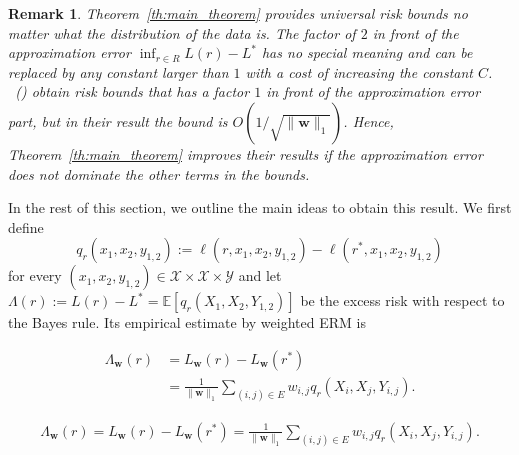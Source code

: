 \documentclass[letterpaper]{article} %
\def\DoubleColumn{}
\def\DoubleColumnEnd{}
\def\SingleColumn{}
\def\SingleColumnEnd{}
\newtheorem{remark}{Remark}
\newtheorem*{remark*}{Remark}
\newcommand{\E}{\mathbb{E}}
\newcommand{\weight}{\mathbf{w}}
\newcommand{\yspace}{\mathcal{Y}}
\newcommand{\bayeserror}{L^*}
\newcommand{\empiricalrisk}[1]{L_{#1}}
\newcommand{\risk}{L}
\newcommand{\lossf}{\ell}
\newcommand{\pair}[1]{(#1)}
\newcommand{\normo}[1]{\|#1\|_1}
\newcommand{\citet}[1]{\citeauthor{#1}\ (\citeyear{#1})}
\begin{document}
\begin{remark*}
Theorem~\ref{th:main_theorem} provides universal risk bounds no matter what the distribution of the data is. The factor of $2$ in front of the approximation error $\inf_{r\in R}\risk(r)-\bayeserror$ has no special meaning and can be replaced by any constant larger than $1$ with a cost of increasing the constant $C$. 
\citet{wang2017learning} obtain risk bounds that has a factor $1$ in front of the approximation error part, but in their result the bound is $O(1/\sqrt{\normo{\weight{}}})$. 
Hence, Theorem~\ref{th:main_theorem} improves their results if the approximation error does not dominate the other terms in the bounds.
\end{remark*}


In the rest of this section, we outline the main ideas to obtain this result.
We first define
\[q_r(x_1,x_2,y_{1,2}):=\lossf(r, x_1,x_2,y_{1,2})-\lossf(r^*,x_1,x_2,y_{1,2})\]
for every $(x_1,x_2,y_{1,2})\in \mathcal X\times\mathcal X\times\yspace{}$ and let $\Lambda(r) := \risk(r)-\bayeserror=\E[q_r(X_1,X_2,Y_{1,2})]$
be the excess risk with respect to the Bayes rule.
Its empirical estimate by weighted ERM is 
\DoubleColumn
\begin{align*}
    \Lambda_\weight{}(r) &= \empiricalrisk{\weight{}}(r)-\empiricalrisk{\weight{}}(r^*)\\
    &=\frac{1}{\normo{\weight{}}}\sum_{\pair{i,j}\in E} w_{i,j} q_r(X_i,X_j,Y_{i,j}).
\end{align*}
\DoubleColumnEnd
\SingleColumn
\begin{align*}
    \Lambda_\weight{}(r) = \empiricalrisk{\weight{}}(r)-\empiricalrisk{\weight{}}(r^*)=\frac{1}{\normo{\weight{}}}\sum_{\pair{i,j}\in E} w_{i,j} q_r(X_i,X_j,Y_{i,j}).
\end{align*}
\SingleColumnEnd
\end{document}
